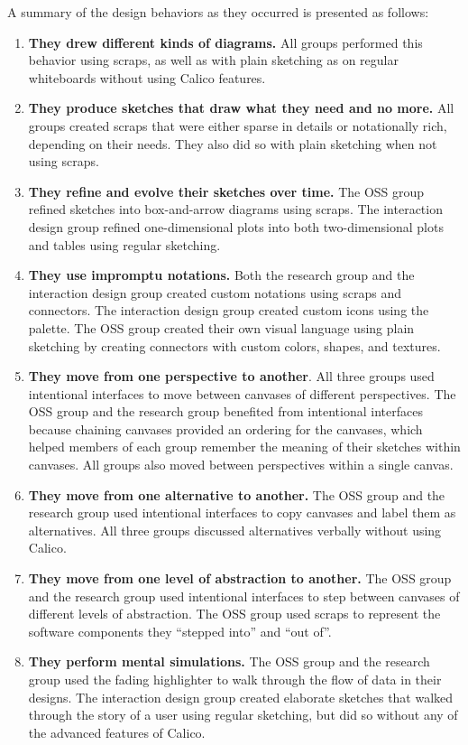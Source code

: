 A summary of the design behaviors as they occurred is presented as follows:

\begin{enumerate}
	\item \textbf{They drew different kinds of diagrams.} All groups performed this behavior using scraps, as well as with plain sketching as on regular whiteboards without using Calico features.
	\item \textbf{They produce sketches that draw what they need and no more.} All groups created scraps that were either sparse in details or notationally rich, depending on their needs. They also did so with plain sketching when not using scraps.
	\item \textbf{They refine and evolve their sketches over time.} The OSS group refined sketches into box-and-arrow diagrams using scraps. The interaction design group refined one-dimensional plots into both two-dimensional plots and tables using regular sketching.
	\item \textbf{They use impromptu notations.} Both the research group and the interaction design group created custom notations using scraps and connectors. The interaction design group created custom icons using the palette. The OSS group created their own visual language using plain sketching by creating connectors with custom colors, shapes, and textures.
	\item \textbf{They move from one perspective to another}. All three groups used intentional interfaces to move between canvases of different perspectives. The OSS group and the research group benefited from intentional interfaces because chaining canvases provided an ordering for the canvases, which helped members of each group remember the meaning of their sketches within canvases. All groups also moved between perspectives within a single canvas.
	\item \textbf{They move from one alternative to another.} The OSS group and the research group used intentional interfaces to copy canvases and label them as alternatives. All three groups discussed alternatives verbally without using Calico.
	\item \textbf{They move from one level of abstraction to another.} The OSS group and the research group used intentional interfaces to step between canvases of different levels of abstraction. The OSS group used scraps to represent the software components they ``stepped into'' and ``out of''.
	\item \textbf{They perform mental simulations.} The OSS group and the research group used the fading highlighter to walk through the flow of data in their designs. The interaction design group created elaborate sketches that walked through the story of a user using regular sketching, but did so without any of the advanced features of Calico.

\end{enumerate}

